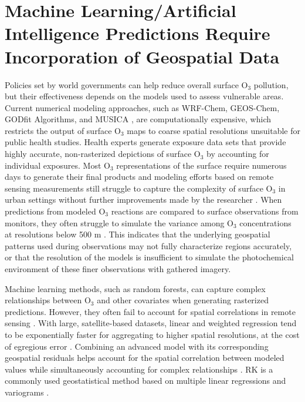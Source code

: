\section{Machine Learning/Artificial Intelligence Predictions Require Incorporation of Geospatial Data} \label{introchap:mlneedgeo} Policies set by world governments can help reduce overall surface O$_3$ pollution, but their effectiveness depends on the models used to assess vulnerable areas. Current numerical modeling approaches, such as WRF-Chem, GEOS-Chem, GODfit Algorithms, and MUSICA \parencite{flandorfer_evaluation_2019,lerot_godfit_2010,lin_spatiotemporal_2016,yu_errors_2018}, are computationally expensive, which restricts the output of surface O$_3$ maps to coarse spatial resolutions unsuitable for public health studies. Health experts generate exposure data sets that provide highly accurate, non-rasterized depictions of surface O$_3$ \parencite{he_surface_2023,malley_updated_2017,turner_long-term_2016} by accounting for individual exposures. Most O$_3$ representations of the surface require numerous days to generate their final products \parencite{kwok_photochemical_2015,lin_spatiotemporal_2016,travis_systematic_2019,wu_apfoam_2021} and modeling efforts based on remote sensing measurements still struggle to capture the complexity of surface O$_3$ in urban settings without further improvements made by the researcher \parencite{balamurugan_tropospheric_2021,wang_evolution_2023}. When predictions from modeled O$_3$ reactions are compared to surface observations from monitors, they often struggle to simulate the variance among O$_3$ concentrations at resolutions below 500 m \parencite{alvarez-mendoza_spatial_2019,kasparoglu_spatial_2018}. This indicates that the underlying geospatial patterns used during observations may not fully characterize regions accurately, or that the resolution of the models is insufficient to simulate the photochemical environment of these finer observations with gathered imagery.

Machine learning methods, such as random forests, can capture complex relationships between O$_3$ and other covariates when generating rasterized predictions. However, they often fail to account for spatial correlations in remote sensing \parencite{liu_improve_2018,runmei_ma_full-coverage_2021,xiong_improving_2023}. With large, satellite-based datasets, linear and weighted regression tend to be exponentially faster for aggregating to higher spatial resolutions, at the cost of egregious error \parencite{feng_investigation_2023,huang_development_2017}. Combining an advanced model with its corresponding geospatial residuals helps account for the spatial correlation between modeled values while simultaneously accounting for complex relationships \parencite{liu_improve_2018}. RK is a commonly used geostatistical method based on multiple linear regressions and variograms \parencite{meng_assessment_2013}.

